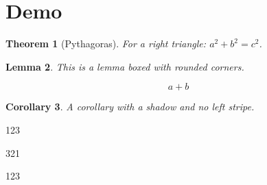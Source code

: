 \documentclass{article}
\newtheorem{theorem}{Theorem}[section]
\newtheorem{lemma}[theorem]{Lemma}
\newtheorem{corollary}[theorem]{Corollary}
\begin{document}
\section{Demo}

\begin{theorem}[Pythagoras]
For a right triangle: $a^2+b^2=c^2$.
\end{theorem}

\begin{lemma}
This is a lemma boxed with rounded corners.
\end{lemma}


\begin{equation}
    a+b
\end{equation}


\begin{corollary}
A corollary with a shadow and no left stripe.
\lipsum[1-5]
\end{corollary}

\begin{roundenv} %
123
\end{roundenv}

\begin{roundenv}[color=RTlemma]
321
\end{roundenv}

\begin{roundenv}[color=RTcorollary]
123
\end{roundenv}
\end{document}

